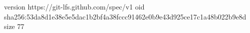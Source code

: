 version https://git-lfs.github.com/spec/v1
oid sha256:53da8d1e38e5e5dac1b2bf4a38fccc91462e0b9e43d925ce17c1a48b022b9e8d
size 77

